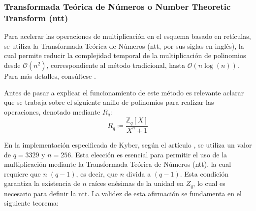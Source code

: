 \subsubsection{Transformada Teórica de Números o Number Theoretic Transform (\acrshort{ntt})}
Para acelerar las operaciones de multiplicación en el esquema basado en retículas, se utiliza la Transformada Teórica de Números (\acrshort{ntt}, por sus siglas en inglés), la cual permite reducir la complejidad temporal de la multiplicación de polinomios desde \(\mathcal{O}(n^2)\), correspondiente al método tradicional, hasta \(\mathcal{O}(n \log(n))\). Para más detalles, consúltese \cite{cryptoeprint:2024/585}.
\newline

Antes de pasar a explicar el funcionamiento de este método es relevante aclarar que se trabaja sobre el siguiente anillo de polinomios para realizar las operaciones, denotado mediante \(R_q\):
\begin{equation}
	R_q \coloneqq \dfrac{\mathbb{Z}_q[X]}{X^n + 1}
\end{equation}

En la implementación especificada de Kyber, según el artículo \cite{kyber-spec-2021}, se utiliza un valor de \(q=3329\) y \(n=256\). Esta elección es esencial para permitir el uso de la multiplicación mediante la Transformada Teórica de Números (\acrshort{ntt}), la cual requiere que \(n| (q-1)\), es decir, que \(n\) divida a \((q-1)\). Esta condición garantiza la existencia de \(n\) raíces enésimas de la unidad en \(Z_q\), lo cual es necesario para definir la \acrshort{ntt}. La validez de esta afirmación se fundamenta en el siguiente teorema\protect\footnotemark[\value{footnote}]:
\newline

